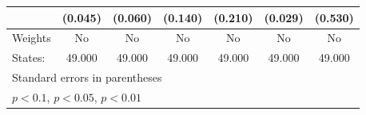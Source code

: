 {\begin{tabular}{l*{6}{c}}
            &     (0.045)         &     (0.060)         &     (0.140)         &     (0.210)         &     (0.029)         &     (0.530)         \\
\hline
Weights     &          No         &          No         &          No         &          No         &          No         &          No         \\
States:     &      49.000         &      49.000         &      49.000         &      49.000         &      49.000         &      49.000         \\
\hline\hline
\multicolumn{7}{l}{\footnotesize Standard errors in parentheses}\\
\multicolumn{7}{l}{\footnotesize \sym{*} \(p<0.1\), \sym{**} \(p<0.05\), \sym{***} \(p<0.01\)}\\
\end{tabular}
}
